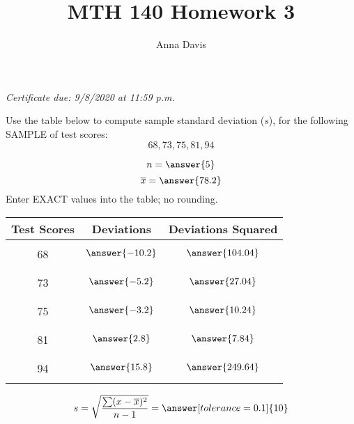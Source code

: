 \documentclass{ximera}
\author{Anna Davis} \title{MTH 140 Homework 3}
\begin{document}
\begin{abstract}

\end{abstract}
\maketitle
 \textit{Certificate due: 9/8/2020 at 11:59 p.m.}
\begin{problem}\label{prob:140hom3prob1}

Use the table below to compute sample standard deviation ($s$), for the following SAMPLE of test scores:
$$68, 73, 75, 81, 94$$

$$n=\answer{5}$$
$$\overline{x}=\answer{78.2}$$
Enter EXACT values into the table; no rounding.
\begin{center}
\begin{tabular}{|c|c|c|}
Test Scores & Deviations & Deviations Squared  \\
 \hline
 \hline
   & &\\
 68 &$\answer{-10.2}$  & $\answer{104.04}$ \\
  & &\\
  \hline
   & &\\
 73 &$\answer{-5.2}$  & $\answer{27.04}$\\
  & &\\
 \hline
  & &\\
 75 &$\answer{-3.2}$ &$\answer{10.24}$ \\
  & &\\
 \hline
  & &\\
 81 &$\answer{2.8}$  &$\answer{7.84}$ \\
  & &\\
 \hline
  & &\\
 94 &$\answer{15.8}$  &$\answer{249.64}$ \\
  & &\\
 \hline
  
\end{tabular}
\end{center}

$$s =\sqrt{\frac{\sum (x-\overline{x})^2}{n-1}}=\answer[tolerance=0.1]{10}$$
 \end{problem}
\end{document}
